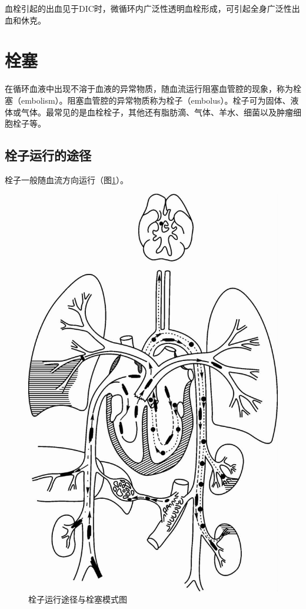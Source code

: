 血栓引起的出血见于DIC时，微循环内广泛性透明血栓形成，可引起全身广泛性出血和休克。

\section{栓塞}

在循环血液中出现不溶于血液的异常物质，随血流运行阻塞血管腔的现象，称为栓塞（embolism）。阻塞血管腔的异常物质称为栓子（embolus）。栓子可为固体、液体或气体。最常见的是血栓栓子，其他还有脂肪滴、气体、羊水、细菌以及肿瘤细胞栓子等。

\subsection{栓子运行的途径}

栓子一般随血流方向运行（图\ref{fig3-9}）。

\begin{figure}[!htbp]
  \centering
  \includegraphics{./images/Image00043.jpg}
  \caption{栓子运行途径与栓塞模式图}
  \label{fig3-9}
\end{figure}

